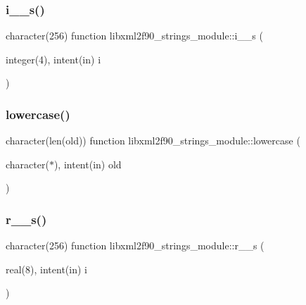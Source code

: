 \subsubsection{\texorpdfstring{i\+\_\+\_\+s()}{i\_2\_s()}}
{\footnotesize\ttfamily character(256) function libxml2f90\+\_\+strings\+\_\+module\+::i\+\_\+\_\+s (\begin{DoxyParamCaption}\item[{integer(4), intent(in)}]{i }\end{DoxyParamCaption})}

\mbox{\label{namespacelibxml2f90__strings__module_a4e91e2d759dc3546b64d31ee3d35e2e7}} 
\subsubsection{\texorpdfstring{lowercase()}{lowercase()}}
{\footnotesize\ttfamily character(len(old)) function libxml2f90\+\_\+strings\+\_\+module\+::lowercase (\begin{DoxyParamCaption}\item[{character($\ast$), intent(in)}]{old }\end{DoxyParamCaption})}

\mbox{\label{namespacelibxml2f90__strings__module_a3e162b5f18f39c8769659ce67d2357a4}} 
\subsubsection{\texorpdfstring{r\+\_\+\_\+s()}{r\_2\_s()}}
{\footnotesize\ttfamily character(256) function libxml2f90\+\_\+strings\+\_\+module\+::r\+\_\+\_\+s (\begin{DoxyParamCaption}\item[{real(8), intent(in)}]{i }\end{DoxyParamCaption})}

